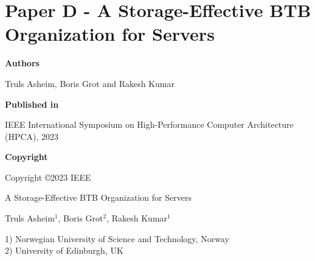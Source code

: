 \documentclass[../../../main.tex]{subfiles}
\begin{document}
\chapter{Paper D - A Storage-Effective BTB Organization for Servers}

\noindent \textbf{Authors}

\vspace*{0.3cm}

\noindent Truls Asheim, Boris Grot and Rakesh Kumar

\vspace*{0.7cm}

\noindent \textbf{Published in}

\vspace*{0.3cm}

\noindent IEEE International Symposium on High-Performance Computer Architecture (HPCA), 2023

\vspace*{0.7cm}

\noindent \textbf{Copyright}

\vspace*{0.3cm}

\noindent Copyright ©2023 IEEE 

\newpage

\vspace*{0.1cm}

\begin{center}

\Huge{A Storage-Effective BTB Organization for Servers}

\vspace{0.6cm}

\large{Truls Asheim$^{1}$, Boris Grot$^{2}$, Rakesh Kumar$^{1}$}

\vspace{0.1cm}

\small{1) Norwegian University of Science and Technology, Norway}\\
\small{2) University of Edinburgh, UK}


\end{center}

\vspace{0.2cm}
\end{document}
